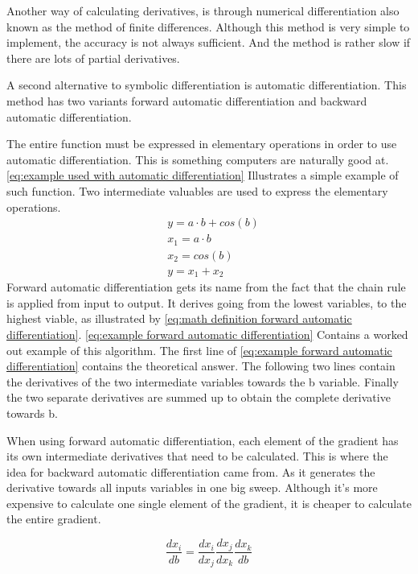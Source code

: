 Another way of calculating derivatives, is through numerical differentiation also known as the method of finite differences. Although this method is very simple to implement, the accuracy is not always sufficient. And the method is rather slow if there are lots of partial derivatives.

A second alternative to symbolic differentiation is automatic differentiation. This method has two variants forward automatic differentiation and backward automatic differentiation.

The entire function must be expressed in elementary operations in order to use automatic differentiation. This is something computers are naturally good at. \eqref{eq:example used with automatic differentiation} Illustrates a simple example of such function. Two intermediate valuables are used to express the elementary operations.
\begin{equation}
	\begin{aligned}
		& y = a \cdot b + cos(b) \\
		& x_1 = a \cdot b \\
		& x_2 = cos(b) \\
		& y = x_1 + x_2		
	\end{aligned}
	\label{eq:example used with automatic differentiation}
\end{equation}
Forward automatic differentiation gets its name from the fact that the chain rule is applied from input to output. It derives going from the lowest variables, to the highest viable, as illustrated by \eqref{eq:math definition forward automatic differentiation}. \eqref{eq:example forward automatic differentiation} Contains a worked out example of this algorithm. The first line of \eqref{eq:example forward automatic differentiation} contains the theoretical answer. The following two lines contain the derivatives of the two intermediate variables towards the b variable. Finally the two separate derivatives are summed up to obtain the complete derivative towards b.

When using forward automatic differentiation, each element of the gradient has its own intermediate derivatives that need to be calculated. This is where the idea for backward automatic differentiation came from. As it generates the derivative towards all inputs variables in one big sweep. Although it's more expensive to calculate one single element of the gradient, it is cheaper to calculate the entire gradient.

\begin{equation}
	\frac{dx_i}{db} = \frac{dx_i}{dx_j}\frac{dx_j}{dx_k}\frac{dx_k}{db}
	\label{eq:math definition forward automatic differentiation}
\end{equation}


